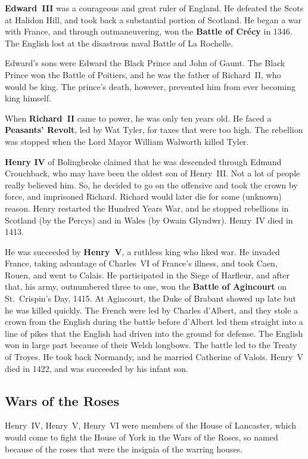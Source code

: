 \textbf{Edward~III} was a courageous and great ruler of England.
He defeated the Scots at Halidon Hill, and took back a substantial portion of Scotland.
He began a war with France, and through outmaneuvering, won the \textbf{Battle of Cr\'ecy} in 1346.
The English lost at the disastrous naval Battle of La Rochelle.

Edward's sons were Edward the Black Prince and John of Gaunt.
The Black Prince won the Battle of Poitiers, and he was the father of Richard~II, who would be king.
The prince's death, however, prevented him from ever becoming king himself.

When \textbf{Richard~II} came to power, he was only ten years old.
He faced a \textbf{Peasants' Revolt}, led by Wat Tyler, for taxes that were too high.
The rebellion was stopped when the Lord Mayor William Walworth killed Tyler.

\textbf{Henry IV} of Bolingbroke claimed that he was descended through Edmund Crouchback,
who may have been the oldest son of Henry~III\@.
Not a lot of people really believed him.
So, he decided to go on the offensive and took the crown by force, and imprisoned Richard.
Richard would later die for some (unknown) reason.
Henry restarted the Hundred Years War, and he stopped rebellions
in Scotland (by the Percys) and in Wales (by Owain Glyndwr).
Henry~IV died in 1413.

He was succeeded by \textbf{Henry~V}, a ruthless king who liked war.
He invaded France, taking advantage of Charles~VI of France's illness,
and took Caen, Rouen, and went to Calais.
He participated in the Siege of Harfleur, and after that,
his army, outnumbered three to one, won the \textbf{Battle of Agincourt} on St.\ Crispin's Day, 1415.
At Agincourt, the Duke of Brabant showed up late but he was killed quickly.
The French were led by Charles d'Albert, and they stole a crown from the English during the battle
before d'Albert led them straight into a line of pikes that the English had driven into the ground for defense.
The English won in large part because of their Welsh longbows.
The battle led to the Treaty of Troyes.
He took back Normandy, and he married Catherine of Valois.
Henry~V died in 1422, and was succeeded by his infant son.

\subsection*{Wars of the Roses}

Henry~IV, Henry~V, Henry~VI were members of the House of Lancaster,
which would come to fight the House of York in the Wars of the Roses,
so named because of the roses that were the insignia of the warring houses.

